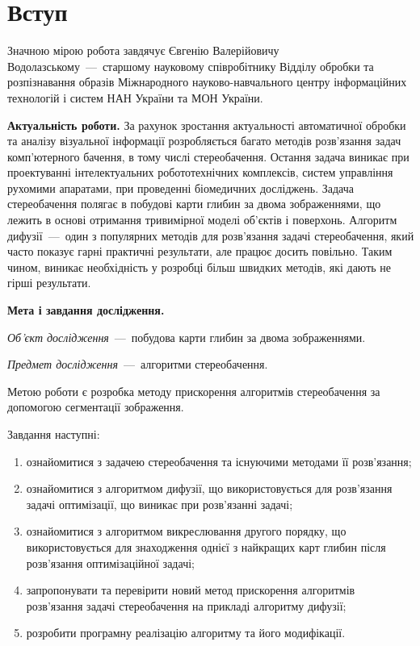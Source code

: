 \chapter*{Вступ}

Значною мірою робота завдячує Євгенію Валерійовичу Водолазському~---~старшому
науковому співробітнику Відділу обробки та розпізнавання образів
Міжнародного науково-навчального центру інформаційних технологій
і систем НАН України та МОН України.

\textbf{Актуальність роботи.}
За рахунок зростання актуальності автоматичної обробки
та аналізу візуальної інформації розробляється багато методів
розв'язання задач комп'ютерного бачення, в тому числі стереобачення.
Остання задача виникає при проектуванні інтелектуальних робототехнічних
комплексів, систем управління рухомими апаратами,
при проведенні біомедичних досліджень.
Задача стереобачення полягає в побудові карти глибин за двома зображеннями,
що лежить в основі отримання тривимірної моделі об'єктів і поверхонь.
Алгоритм дифузії~---~один з популярних методів для розв'язання задачі
стереобачення, який часто показує гарні практичні результати,
але працює досить повільно.
Таким чином, виникає необхідність у розробці більш швидких методів,
які дають не гірші результати.

\textbf{Мета і завдання дослідження.}

\textit{Об'єкт дослідження}~---~побудова карти глибин за двома зображеннями.

\textit{Предмет дослідження}~---~алгоритми стереобачення.

Метою роботи є розробка методу прискорення алгоритмів стереобачення
за допомогою сегментації зображення.

Завдання наступні:
\begin{enumerate}
  \item
    ознайомитися з задачею стереобачення та існуючими методами її розв'язання;
  \item
    ознайомитися з алгоритмом дифузії,
    що використовується для розв'язання задачі оптимізації,
    що виникає при розв'язанні задачі;
  \item
    ознайомитися з алгоритмом викреслювання другого порядку,
    що використовується для знаходження однієї з найкращих карт глибин
    після розв'язання оптимізаційної задачі;
  \item
    запропонувати та перевірити новий метод прискорення
    алгоритмів розв'язання задачі стереобачення на прикладі алгоритму дифузії;
  \item
    розробити програмну реалізацію алгоритму та його модифікації.
\end{enumerate}

